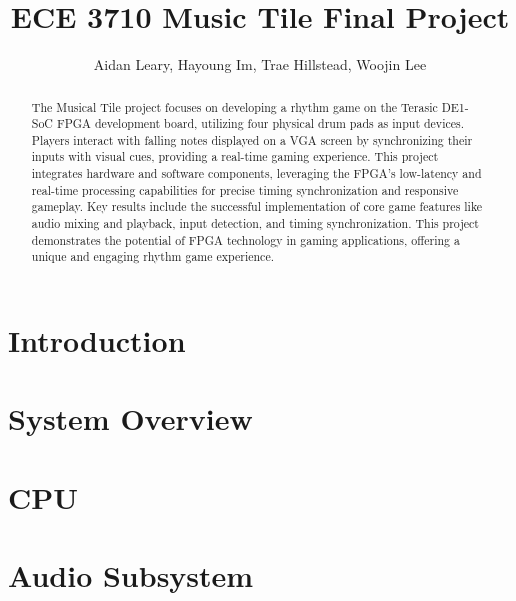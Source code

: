\documentclass[10pt, letterpaper]{IEEEconf}
\begin{document}
\title{ECE 3710 Music Tile Final Project\\
}

  \author{
  {Aidan Leary, Hayoung Im, Trae Hillstead, Woojin Lee}
  }


  \maketitle

  \begin{abstract}
The Musical Tile project focuses on developing a rhythm game on the Terasic DE1-SoC FPGA 
development board, 
utilizing four physical drum pads as input devices. Players interact with falling notes 
displayed on a VGA screen by synchronizing their inputs with visual cues, providing a 
real-time gaming experience. This project integrates hardware and software components, 
leveraging the FPGA's low-latency and real-time processing capabilities for precise 
timing synchronization and responsive gameplay. Key results include the successful 
implementation of core game features like audio mixing and playback, input detection, and 
timing synchronization.
This project demonstrates the potential of FPGA technology in gaming applications, 
offering a unique and engaging rhythm game experience.
  \end{abstract}


  \section{Introduction} 
  

  \section{System Overview}
  

  \section{CPU}
  

  \section{Audio Subsystem}
  
\end{document}
